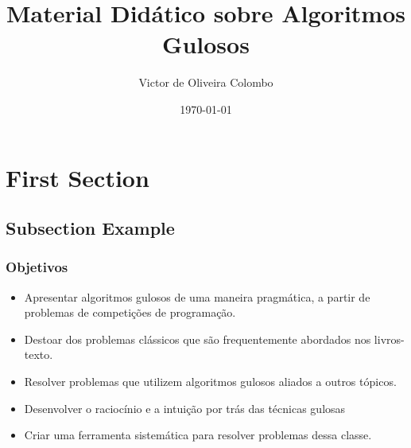 \documentclass{beamer}
\title[Algoritmos Gulosos]{Material Didático sobre Algoritmos Gulosos} %
\author{Victor de Oliveira Colombo} %
\institute[IME-USP] %
{
Instituto de Matemática e Estatística da Universidade de São Paulo \\ %
\medskip
\textit{victor.colombo@usp.br} %
}
\date{\today} %
\begin{document}
\begin{frame}
\titlepage %
\end{frame}



\section{First Section} %

\subsection{Subsection Example} %

\begin{frame}
\frametitle{Objetivos}
\begin{itemize}
\item Apresentar algoritmos gulosos de uma maneira pragmática, a partir de problemas
de competições de programação.

\item Destoar dos problemas clássicos que são frequentemente abordados nos livros-texto.

\item Resolver problemas que utilizem algoritmos gulosos aliados a outros tópicos.

\item Desenvolver o raciocínio e a intuição por trás das técnicas gulosas

\item Criar uma ferramenta sistemática para resolver problemas dessa classe.
\end{itemize}
\end{frame}
\end{document}
